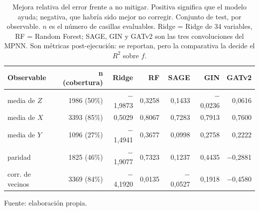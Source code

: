 \begin{table}[htbp]
    \centering
    {\footnotesize
    \begin{tabular}{@{}lrrrrrr@{}}
        \toprule
        \textbf{Observable} & \textbf{n (cobertura)} & \textbf{Ridge} & \textbf{RF} & \textbf{SAGE} & \textbf{GIN} & \textbf{GATv2} \\
        \midrule
        media de $Z$ & 1986 (50\%) & $-$1,9873 & 0,3258 & 0,1433 & $-$0,0236 & 0,0616 \\
        media de $X$ & 3393 (85\%) & 0,5029 & 0,8067 & 0,7283 & 0,7913 & 0,7600 \\
        media de $Y$ & 1096 (27\%) & $-$1,4941 & 0,3677 & 0,0998 & 0,2758 & 0,2222 \\
        paridad & 1825 (46\%) & $-$1,9077 & 0,7323 & 0,1237 & 0,4435 & $-$0,2881 \\
        corr. de vecinos & 3369 (84\%) & $-$4,1920 & 0,0135 & $-$0,0527 & 0,1918 & $-$0,4580 \\
        \bottomrule
    \end{tabular}}

    \caption{Mejora relativa del error frente a no mitigar. Positiva significa que el modelo ayuda; negativa, que habría sido mejor no corregir. Conjunto de test, por observable. $n$ es el número de casillas evaluables. Ridge = Ridge de 34 variables, RF = Random Forest; SAGE, GIN y GATv2 son las tres convoluciones del MPNN.  Son métricas post-ejecución: se reportan, pero la comparativa la decide el $R^2$ sobre $f$.}
    \label{tab:mitigacion_mejora}

    {\footnotesize Fuente: elaboración propia.}
\end{table}
